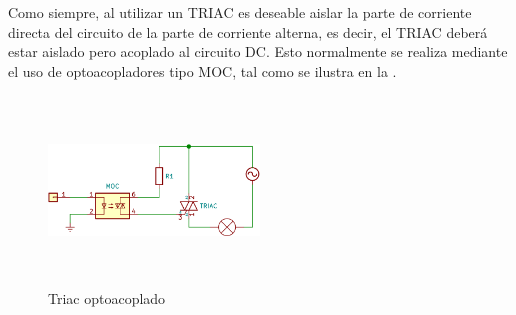 Como siempre, al utilizar un TRIAC es deseable aislar la parte de corriente directa del circuito de la parte de corriente alterna, es decir, el TRIAC deberá estar aislado pero acoplado al circuito DC.
Esto normalmente se realiza mediante el uso de optoacopladores tipo MOC, tal como se ilustra en la .

\begin{figure}[H]
	\centering
	\includegraphics[width=0.5\textwidth,height=5cm,keepaspectratio]{img/triac-circuit.png}
	\caption{Triac optoacoplado}
	\label{fig:triac-circuit} %
\end{figure}
